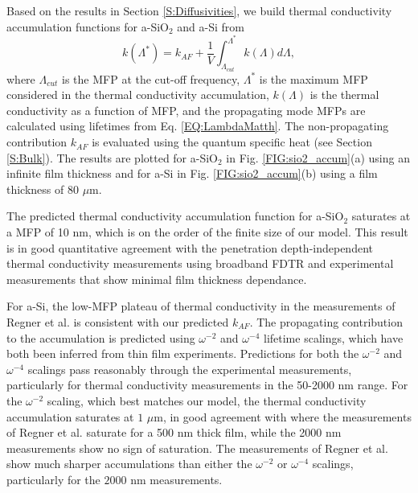 Based on the results in Section \ref{S:Diffusivities}, we build 
thermal conductivity accumulation functions for a-SiO$_2$ and a-Si 
from
\begin{equation}\label{EQ:kLambda}
k(\Lambda^{*}) = k_{AF} + 
\frac{1}{V}\int^{\Lambda^{*}}_{\Lambda_{cut}} 
k(\Lambda)d\Lambda,
\end{equation}
where $\Lambda_{cut}$ is the MFP at the cut-off frequency, 
$\Lambda^*$ is the maximum MFP considered in the thermal 
conductivity accumulation, $k(\Lambda)$ is the thermal conductivity 
as a function of MFP, and the propagating mode MFPs are 
calculated using lifetimes from Eq. \eqref{EQ:LambdaMatth}. The 
non-propagating contribution $k_{AF}$ is evaluated using the quantum 
specific heat (see Section \ref{S:Bulk}). 
The results are plotted for a-SiO$_2$ 
in Fig. \ref{FIG:sio2_accum}(a) using an infinite film thickness 
and for a-Si in Fig. \ref{FIG:sio2_accum}(b) using a film 
thickness of $80$ $\mu$m.  

The predicted thermal conductivity accumulation function for a-SiO$_2$ 
saturates at a MFP of 10 nm, which is on the order of the finite size 
of our model. This result is in good quantitative agreement 
with the penetration depth-independent thermal 
conductivity measurements using broadband FDTR
\cite{regner_broadband_2013} and experimental measurements 
that show minimal film thickness dependance.
\cite{lee_heat_1997,yamane_measurement_2002} 

For a-Si, the low-MFP plateau of thermal conductivity in the   
measurements of Regner et al. is consistent with our 
predicted $k_{AF}$. 
The propagating contribution to the accumulation is predicted 
using $\omega^{-2}$ and $\omega^{-4}$ lifetime scalings, which 
have both been inferred from thin film experiments.
\cite{feldman_thermal_1993,cahill_thermal_1994,
feldman_numerical_1999,zink_thermal_2006,zink_excess_2006,
liu_high_2009,yang_anomalously_2010} 
Predictions for both the $\omega^{-2}$ 
and $\omega^{-4}$ scalings pass reasonably 
through the experimental measurements, particularly for thermal 
conductivity measurements in the 50-2000 nm range. 
For the $\omega^{-2}$ scaling, which best matches our model, 
the thermal conductivity accumulation 
saturates at $1$ $\mu$m, in good agreement with where the measurements 
of Regner et al. saturate for a 500 nm thick film, while the 2000 nm 
measurements show no sign of saturation. 
The measurements of Regner et al. show much sharper accumulations 
than either the $\omega^{-2}$ or $\omega^{-4}$ scalings, 
particularly for the $2000$ nm measurements. 

